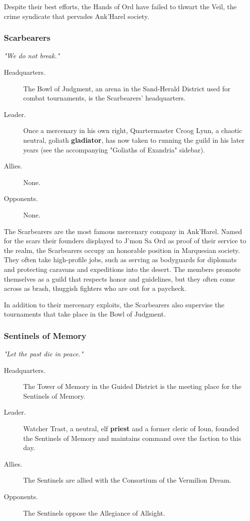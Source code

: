 \documentclass[10pt,a4paper,twoside,fancy,bg=print,twocolumn,openany,nodeprecatedcode]{dndbook}
\begin{document}
Despite their best efforts, the Hands of Ord have failed to thwart the Veil, the crime syndicate that pervades Ank'Harel society.

\subsubsection{Scarbearers}
\textit{"We do not break."}


\begin{description}
\item[Headquarters.]
The Bowl of Judgment, an arena in the Sand-Herald District used for combat tournaments, is the Scarbearers' headquarters.
\item[Leader.]
Once a mercenary in his own right, Quartermaster Croog Lynn, a chaotic neutral, goliath \textbf{gladiator}, has now taken to running the guild in his later years (see the accompanying "Goliaths of Exandria" sidebar).
\item[Allies.]
None.
\item[Opponents.]
None.
\end{description}

The Scarbearers are the most famous mercenary company in Ank'Harel. Named for the scars their founders displayed to J'mon Sa Ord as proof of their service to the realm, the Scarbearers occupy an honorable position in Marquesian society. They often take high-profile jobs, such as serving as bodyguards for diplomats and protecting caravans and expeditions into the desert. The members promote themselves as a guild that respects honor and guidelines, but they often come across as brash, thuggish fighters who are out for a paycheck.

In addition to their mercenary exploits, the Scarbearers also supervise the tournaments that take place in the Bowl of Judgment.

\subsubsection{Sentinels of Memory}
\textit{"Let the past die in peace."}


\begin{description}
\item[Headquarters.]
The Tower of Memory in the Guided District is the meeting place for the Sentinels of Memory.
\item[Leader.]
Watcher Trast, a neutral, elf \textbf{priest} and a former cleric of Ioun, founded the Sentinels of Memory and maintains command over the faction to this day.
\item[Allies.]
The Sentinels are allied with the Consortium of the Vermilion Dream.
\item[Opponents.]
The Sentinels oppose the Allegiance of Allsight.
\end{description}
\end{document}
